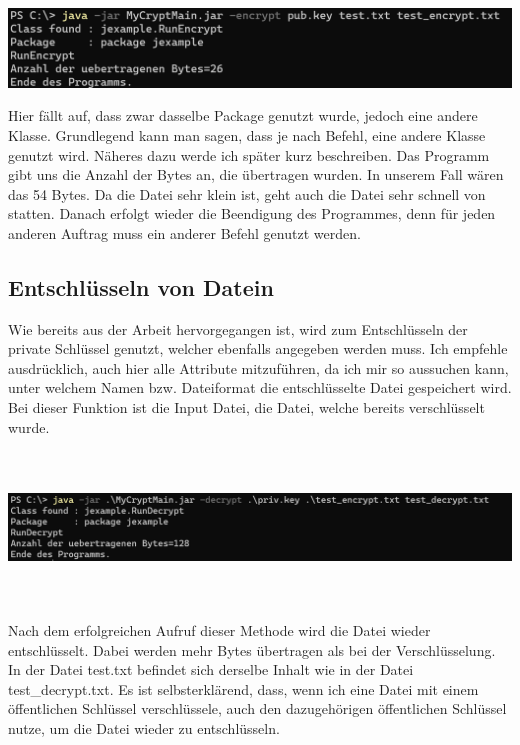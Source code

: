 \begin{center}
	\includegraphics[width=\textwidth]{./img/encrypt}
\end{center}
Hier fällt auf, dass zwar dasselbe Package genutzt wurde, jedoch eine andere Klasse. Grundlegend kann man sagen, dass je nach Befehl, eine andere Klasse genutzt wird. Näheres dazu werde ich später kurz beschreiben. Das Programm gibt uns die Anzahl der Bytes an, die übertragen wurden. In unserem Fall wären das 54 Bytes. Da die Datei sehr klein ist, geht auch die Datei sehr schnell von statten. Danach erfolgt wieder die Beendigung des Programmes, denn für jeden anderen Auftrag muss ein anderer Befehl genutzt werden. \\

\subsection{Entschlüsseln von Datein}
Wie bereits aus der Arbeit hervorgegangen ist, wird zum Entschlüsseln der private Schlüssel genutzt, welcher ebenfalls angegeben werden muss. Ich empfehle ausdrücklich, auch hier alle Attribute mitzuführen, da ich mir so aussuchen kann, unter welchem Namen bzw. Dateiformat die entschlüsselte Datei gespeichert wird. Bei dieser Funktion ist die Input Datei, die Datei, welche bereits verschlüsselt wurde.\\


\begin{center}
	\includegraphics[width=\textwidth,height=4cm]{./img/decrypt}
\end{center}

Nach dem erfolgreichen Aufruf dieser Methode wird die Datei wieder entschlüsselt. Dabei werden mehr Bytes übertragen als bei der Verschlüsselung.
In der Datei test.txt befindet sich derselbe Inhalt wie in der Datei test\_decrypt.txt. Es ist selbsterklärend, dass, wenn ich eine Datei mit einem öffentlichen Schlüssel verschlüssele, auch den dazugehörigen öffentlichen Schlüssel nutze, um die Datei wieder zu entschlüsseln.

